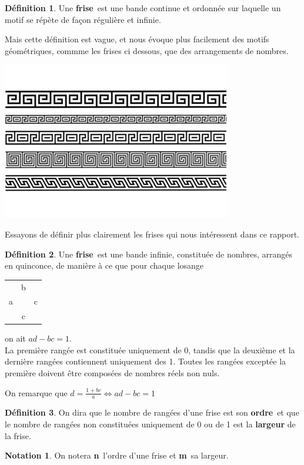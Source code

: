 \documentclass[a4paper]{article}
\theoremstyle{plain}
\theoremstyle{definition}
\newtheorem{nota}{Notation}[section]
\newtheorem{defn}{Définition}[section]
\theoremstyle{proof}
\theoremstyle{remark}
\begin{document}
\begin{defn}
Une \textbf{frise}\ est une bande continue et ordonnée sur laquelle un motif se répète de façon régulière et infinie. 
\end{defn}

Mais cette définition est vague, et nous évoque plus facilement des motifs géométriques, commme les frises ci dessous, que des arrangements de nombres.
\\
\begin{center}
\includegraphics{frise.jpg}
\end{center}
Essayons de définir plus clairement les frises qui nous intéressent dans ce rapport.
\begin{defn}
Une \textbf{frise}\ est une bande infinie, constituée de nombres, arrangés en quinconce, de manière à ce que pour chaque losange 
\begin{tabular}{ccc}
&b&\\a&&c\\&c&
\end{tabular}
on ait $ad-bc=1$.\\
La première rangée est constituée uniquement de 0, tandis que la deuxième et la dernière rangées contiennent uniquement des 1.
Toutes les rangées exceptée la première doivent être composées de nombres réels non nuls.
\end{defn}
On remarque que $d=\frac{1+bc}{a} \Leftrightarrow ad-bc=1$ 
\begin{defn}
On dira que le nombre de rangées d'une frise est son \textbf{ordre}\ et que le nombre de rangées non constituées uniquement de 0 ou de 1 est la \textbf{largeur} de la frise.
\end{defn}
\begin{nota}
On notera \textbf{n}\ l'ordre d'une frise et \textbf{m}\ sa largeur. 
\end{nota}
\end{document}

